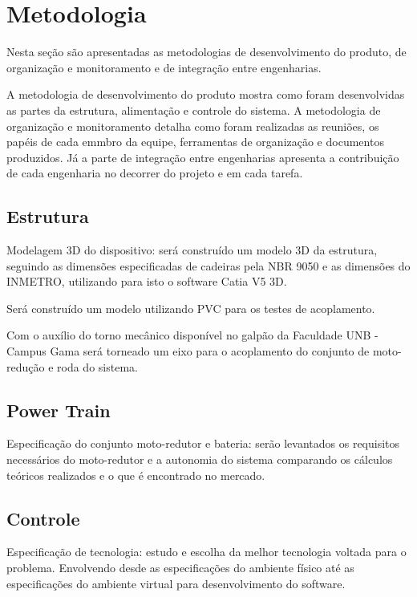 \chapter[Metodologia]{Metodologia}

Nesta seção são apresentadas as metodologias de desenvolvimento do produto, de organização e monitoramento e de integração entre engenharias.

A metodologia de desenvolvimento do produto mostra como foram desenvolvidas as partes da estrutura, alimentação e controle do sistema. A metodologia de organização e monitoramento detalha como foram realizadas as reuniões, os papéis de cada emmbro da equipe, ferramentas de organização e documentos produzidos. Já a parte de integração entre engenharias apresenta a contribuição de cada engenharia no decorrer do projeto e em cada tarefa.

\section{Estrutura}

Modelagem 3D do dispositivo: será construído um modelo 3D da estrutura, seguindo as dimensões especificadas de cadeiras pela NBR 9050 \cite{nbr9050} e as dimensões do INMETRO, utilizando para isto o software Catia V5 3D.

Será construído um modelo utilizando PVC para os testes de acoplamento.

Com o auxílio do torno mecânico disponível no galpão da Faculdade UNB - Campus Gama será torneado um eixo para o acoplamento do conjunto de moto-redução e roda do sistema.

\section{Power Train}

Especificação do conjunto moto-redutor e bateria: serão levantados os requisitos necessários do moto-redutor e a autonomia do sistema comparando os cálculos teóricos realizados e o que é encontrado no mercado.

\section{Controle}

	Especificação de tecnologia: estudo e escolha da melhor tecnologia voltada para o problema. Envolvendo desde as especificações do ambiente físico até as especificações do ambiente virtual para desenvolvimento do software.

